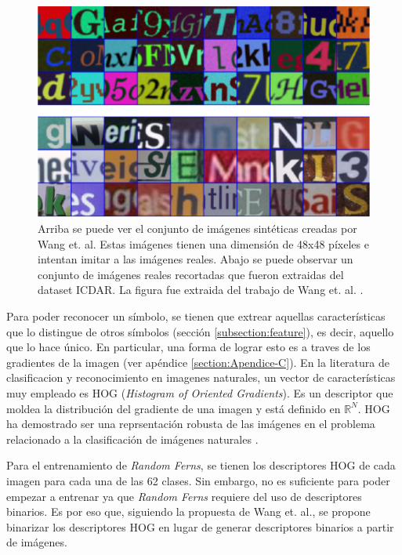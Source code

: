 		\begin{figure}[htbp]
			\centering
			\includegraphics[scale=0.5]{img/synth_data_wang.png}
			\caption[Datos sintéticos Wang]{Arriba se puede ver el conjunto de imágenes sintéticas creadas por Wang et. al. Estas imágenes tienen una dimensión de 48x48 píxeles e intentan imitar a las imágenes reales. Abajo se puede observar un conjunto de imágenes reales recortadas que  fueron extraidas del dataset ICDAR. La figura fue extraida del trabajo de Wang et. al. \cite{wang}.}
			\label{fig: Datos sinteticos Wang}
		\end{figure}
	
	Para poder reconocer un símbolo, se tienen que extrear aquellas características que lo distingue de otros símbolos (sección \ref{subsection:feature}), es decir, aquello que lo hace único. En particular, una forma de lograr esto es a traves de los gradientes de la imagen (ver apéndice \ref{section:Apendice-C}). En la literatura de clasificacion y reconocimiento en imagenes naturales, un vector de características muy empleado es HOG (\textit{Histogram of Oriented Gradients}). Es un descriptor que moldea la distribución del gradiente de una imagen y está definido en $\mathbb{R}^N$. HOG ha demostrado ser una reprsentación robusta de las imágenes en el problema relacionado a la clasificación de imágenes naturales \cite{DT05}. 
	
	Para el entrenamiento de \textit{Random Ferns}, se tienen los descriptores HOG de cada imagen para cada una de las 62 clases. Sin embargo, no es suficiente para poder empezar a entrenar ya que \textit{Random Ferns} requiere del uso de descriptores binarios. Es por eso que, siguiendo la propuesta de Wang et. al., se propone binarizar los descriptores HOG en lugar de generar descriptores binarios a partir de imágenes.
	
